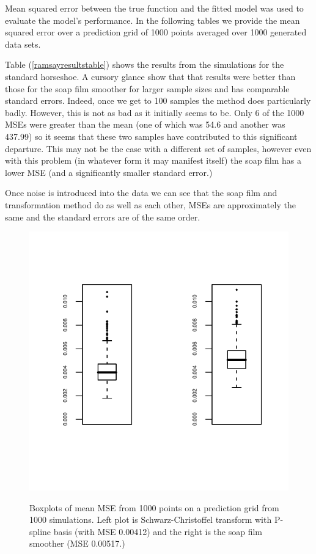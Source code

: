 \documentclass[a4paper,10pt]{amsart}
\newcommand{\sch}{Schwarz-Christoffel }
\begin{document}
Mean squared error between the true function and the fitted model was used to evaluate the model's performance. In the following tables we provide the mean squared error over a prediction grid of 1000 points averaged over 1000 generated data sets.



Table (\ref{ramsayresultstable}) shows the results from the simulations for the standard horseshoe. A cursory glance show that that results were better than those for the soap film smoother for larger sample sizes and has comparable standard errors. Indeed, once we get to 100 samples the method does particularly badly. However, this is not as bad as it initially seems to be. Only 6 of the 1000 MSEs were greater than the mean (one of which was 54.6 and another was 437.99) so it seems that these two samples have contributed to this significant departure. This may not be the case with a different set of samples, however even with this problem (in whatever form it may manifest itself) the soap film has a lower MSE (and a significantly smaller standard error.) 

Once noise is introduced into the data we can see that the soap film and transformation method do as well as each other, MSEs are approximately the same and the standard errors are of the same order.

\begin{figure}
\centering
\includegraphics[trim=0.5in 1in 0in 0.5in]{figs/1000boxplots.pdf} \\
\caption{Boxplots of mean MSE from 1000 points on a prediction grid from 1000 simulations. Left plot is \sch transform with P-spline basis (with MSE 0.00412) and the right is the soap film smoother (MSE 0.00517.)}
\label{1000boxplots}
\end{figure}
\end{document}
